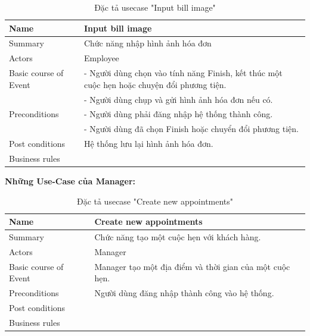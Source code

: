 \documentclass[a4paper]{article}
\begin{document}
\begin{table}[!h]
    \centering
    \begin{tabular}{|m{3.2cm}|m{10.5cm}|}
        \hline
        Name & Input bill image\\
        \hline
        Summary & Chức năng nhập hình ảnh hóa đơn\\
        \hline
        Actors & Employee\\
        \hline
        Basic course of Event & -	Người dùng chọn vào tính năng Finish, kết thúc một cuộc hẹn hoặc chuyện đổi phương tiện.\\
&-	Người dùng chụp và gửi hình ảnh hóa đơn nếu có.\\
        \hline
        Preconditions &-	Người dùng  phải đăng nhập hệ thống thành công.\\
&-	Người dùng đã chọn Finish hoặc chuyển đổi phương tiện.\\
        \hline
        Post conditions & Hệ thống lưu lại hình ảnh hóa đơn.\\
        \hline
        Business rules & \\
        \hline
    \end{tabular}
    \caption{Đặc tả usecase "Input bill image"}
\end{table}
\clearpage
\noindent
\textbf{Những Use-Case của Manager:}\\
\begin{table}[!h]
    \centering
    \begin{tabular}{|m{3.2cm}|m{10.5cm}|}
        \hline
        Name & Create new appointments\\
        \hline
        Summary & Chức năng tạo một cuộc hẹn với khách hàng.\\
        \hline
        Actors & Manager\\
        \hline
        Basic course of Event & Manager tạo một địa điểm và thời gian của một cuộc hẹn.\\
        \hline
        Preconditions &Người dùng đăng nhập thành công vào hệ thống.\\
        \hline
        Post conditions & \\
        \hline
        Business rules & \\
        \hline
    \end{tabular}
    \caption{Đặc tả usecase "Create new appointments"}
\end{table}
\end{document}
